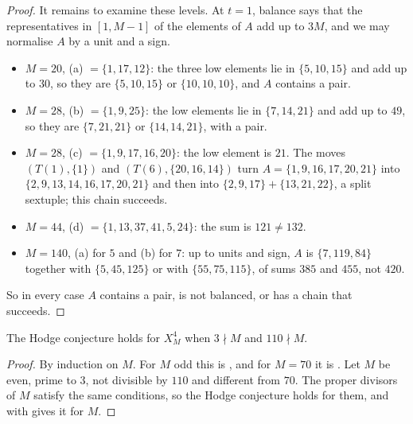 \begin{proof}
It remains to examine these levels. At $t=1$, balance says that the
representatives in $[1,M-1]$ of the elements of $A$ add up to $3M$, and we
may normalise $A$ by a unit and a sign.
\begin{itemize}
\item $M=20$, (a) $=\{1,17,12\}$: the three low elements lie in
$\{5,10,15\}$ and add up to $30$, so they are $\{5,10,15\}$ or
$\{10,10,10\}$, and $A$ contains a pair.
\item $M=28$, (b) $=\{1,9,25\}$: the low elements lie in $\{7,14,21\}$ and add
up to $49$, so they are $\{7,21,21\}$ or $\{14,14,21\}$, with a pair.
\item $M=28$, (c) $=\{1,9,17,16,20\}$: the low element is $21$. The moves
$(T(1),\{1\})$ and $(T(6),\{20,16,14\})$ turn
$A=\{1,9,16,17,20,21\}$ into $\{2,9,13,14,16,17,20,21\}$ and then into
$\{2,9,17\}+\{13,21,22\}$, a split sextuple; this chain succeeds.
\item $M=44$, (d) $=\{1,13,37,41,5,24\}$: the sum is $121\ne132$.
\item $M=140$, (a) for $5$ and (b) for $7$: up to units and sign, $A$ is
$\{7,119,84\}$ together with $\{5,45,125\}$ or with $\{55,75,115\}$, of sums
$385$ and $455$, not $420$.
\end{itemize}
So in every case $A$ contains a pair, is not balanced, or has a chain that
succeeds.
\end{proof}

\begin{theorem}\label{thm:primetothree}
The Hodge conjecture holds for $X^{4}_{M}$ when $3\nmid M$ and $110\nmid M$.
\end{theorem}

\begin{proof}
By induction on $M$. For $M$ odd this is , and for $M=70$ it is
. Let $M$ be even, prime to $3$, not divisible by $110$
and different from $70$. The proper divisors of $M$ satisfy the same
conditions, so the Hodge conjecture holds for them, and
 with  gives it for $M$.
\end{proof}
